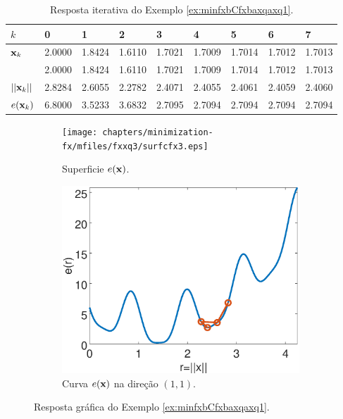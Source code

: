 \begin{table}[h!]
\centering
\begin{tabular}{|l|l|l|l|l|l|l|l|l|}
\hline
$k$ & 0 & 1 & 2 & 3 & 4 & 5 & 6 & 7\\ \hline
$\VECTOR{x}_k$ & 2.0000 & 1.8424 & 1.6110 & 1.7021 & 1.7009 & 1.7014 & 1.7012 & 1.7013 \\ 
~              & 2.0000 & 1.8424 & 1.6110 & 1.7021 & 1.7009 & 1.7014 & 1.7012 & 1.7013 \\ \hline
$||\VECTOR{x}_k||$ & 2.8284 & 2.6055 & 2.2782 & 2.4071 & 2.4055 & 2.4061 & 2.4059 & 2.4060 \\ \hline
$e(\VECTOR{x}_k)$ & 6.8000 & 3.5233 & 3.6832 & 2.7095 & 2.7094 & 2.7094 & 2.7094 & 2.7094 \\ \hline
\end{tabular}
\caption{Resposta iterativa do Exemplo \ref{ex:minfxbCfxbaxqaxq1}.}
\label{table:ex:minfxbCfxbaxqaxq3}
\end{table}
\begin{figure}[h!]
     \centering
     \begin{subfigure}[b]{0.49\textwidth}
         \centering
         \texttt{[image: chapters/minimization-fx/mfiles/fxxq3/surfcfx3.eps]}
         \caption{Superficie $e(\VECTOR{x})$. }
         \label{fig:ex:minfxbCfxbaxqaxq3:a}
     \end{subfigure}
     \hfill
     \begin{subfigure}[b]{0.49\textwidth}
         \centering
         \includegraphics[width=0.98\textwidth]{chapters/minimization-fx/mfiles/fxxq3/plotfx3.eps}
         \caption{Curva $e(\VECTOR{x})$ na direção $(1,1)$.}
         \label{fig:ex:minfxbCfxbaxqaxq3:b}
     \end{subfigure}
        \caption{Resposta gráfica do Exemplo \ref{ex:minfxbCfxbaxqaxq1}. }
        \label{fig:ex:minfxbCfxbaxqaxq3}
\end{figure}

